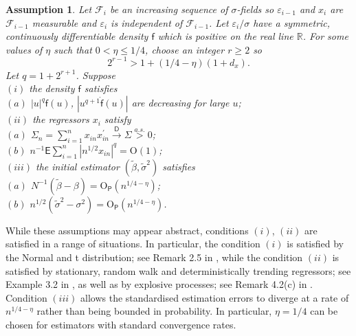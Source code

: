 \documentclass[11pt, letterpaper]{article}
\newtheorem{assumption}{Assumption}
\numberwithin{algorithm}{section}
\numberwithin{assumption}{section}
\numberwithin{lemma}{section}
\numberwithin{theorem}{section}
\numberwithin{corollary}{section}
\numberwithin{remark}{section}
\numberwithin{equation}{section}
\numberwithin{figure}{section}
\numberwithin{table}{section}
\begin{document}
\begin{assumption} \label{sufficient assumptions}
Let $\mathcal{F}_{i}$ be an increasing sequence of $\sigma$-fields so $\varepsilon_{i-1}$ and $x_{i}$ are $\mathcal{F}_{i-1}$ measurable and $\varepsilon_{i}$ is independent of $\mathcal{F}_{i-1}$. Let $\varepsilon_{i} / \sigma$ have a symmetric, continuously differentiable density $\mathsf{f}$ which is positive on the real line $\mathbb{R}$. For some values of $\eta$ such that $0 < \eta \le 1/4$, choose an integer $r \ge 2$ so
\begin{equation} \label{tradeoff btw moments and boundedness}
2^{r - 1} > 1 + (1/4 - \eta) (1 + d_{x}).
\end{equation}
Let $q = 1 + 2^{r + 1}$. Suppose \\
$(i)$ the density $\mathsf{f}$ satisfies \\
\indent $(a)$ $|u|^{q}\mathsf{f}(u)$, $|u^{q+1}\dot{\mathsf{f}}(u)|$ are decreasing for large $u$; \\
$(ii)$ the regressors $x_{i}$ satisfy \\
\indent $(a)$ $\Sigma_{n} = \sum_{i=1}^{n} x_{in} x_{in}^{\prime} \overset{\mathsf{D}}{\to} \Sigma \overset{a.s.}{>} 0$; \\
\indent $(b)$ $n^{-1} \mathsf{E} \sum_{i=1}^{n} |n^{1/2} x_{in}|^{q} = \mathrm{O}(1)$; \\
$(iii)$ the initial estimator $( \widetilde{\beta}, \widetilde{\sigma}^{2} )$ satisfies \\
\indent $(a)$ $N^{-1}(\widetilde{\beta} - \beta) = \mathrm{O}_{\mathsf{P}}(n^{1/4 - \eta})$; \\
\indent $(b)$ $n^{1/2} (\widetilde{\sigma}^{2} - \sigma^{2}) = \mathrm{O}_{\mathsf{P}}(n^{1/4 - \eta})$.
\end{assumption}

While these assumptions may appear abstract, conditions $(i)$, $(ii)$ are satisfied in a range of situations. In particular, the condition $(i)$ is satisfied by the Normal and t distribution; see Remark 2.5 in \cite{berenguer2018marked},
while the condition $(ii)$ is satisfied by stationary, random walk and deterministically trending regressors; see Example 3.2 in \cite{johansen2016analysis}, as well as by explosive processes; see Remark 4.2(c) in \cite{berenguer2019analysis}. Condition $(iii)$ allows the standardised estimation errors to diverge at a rate of $n^{1/4 - \eta}$ rather than being bounded in probability. In particular, $\eta = 1/4$ can be chosen for estimators with standard convergence rates.
\end{document}
